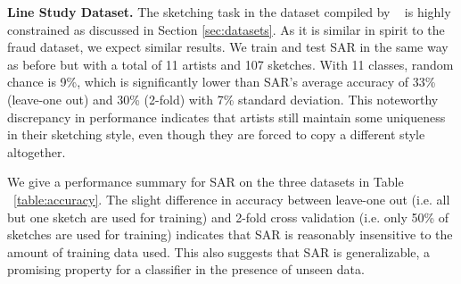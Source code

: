 



\noindent\textbf{Line Study Dataset.} The sketching task in the dataset compiled by ~\cite{Cole:2008:PDL:1360612.1360687} is highly constrained as discussed in Section \ref{sec:datasets}. As it is similar in spirit to the fraud dataset, we expect similar results. We train and test SAR in the same way as before but with a total of 11 artists and 107 sketches. With 11 classes, random chance is 9\%, which is significantly lower than SAR's average accuracy of 33\% (leave-one out) and 30\% (2-fold) with 7\% standard deviation. This noteworthy discrepancy in performance indicates that artists still maintain some uniqueness in their sketching style, even though they are forced to copy a different style altogether.

We give a performance summary for SAR on the three datasets in Table ~\ref{table:accuracy}. The slight difference in accuracy between leave-one out (i.e. all but one sketch are used for training) and 2-fold cross validation (i.e. only 50\% of sketches are used for training) indicates that SAR is reasonably insensitive to the amount of training data used. This also suggests that SAR is generalizable, a promising property for a classifier in the presence of unseen data.

